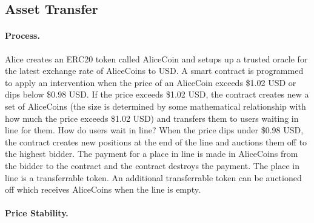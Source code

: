 







\subsection{Asset Transfer}
\label{sec:basecoin}


\paragraph{Process.} Alice creates an ERC20 token called AliceCoin and setups up a trusted oracle for the latest exchange rate of AliceCoins to USD. A smart contract is programmed to apply an intervention when the price of an AliceCoin exceeds \$1.02 USD or dips below \$0.98 USD.  If the price exceeds \$1.02 USD, the contract creates new a set of AliceCoins (the size is determined by some mathematical relationship with how much the price exceeds \$1.02 USD) and transfers them to users waiting in line for them. How do users wait in line? When the price dips under \$0.98 USD, the contract creates new positions at the end of the line and auctions them off to the highest bidder. The payment for a place in line is made in AliceCoins from the bidder to the contract and the contract destroys the payment. The place in line is a transferrable token. An additional transferrable token can be auctioned off which receives AliceCoins when the line is empty.


\paragraph{Price Stability.}


